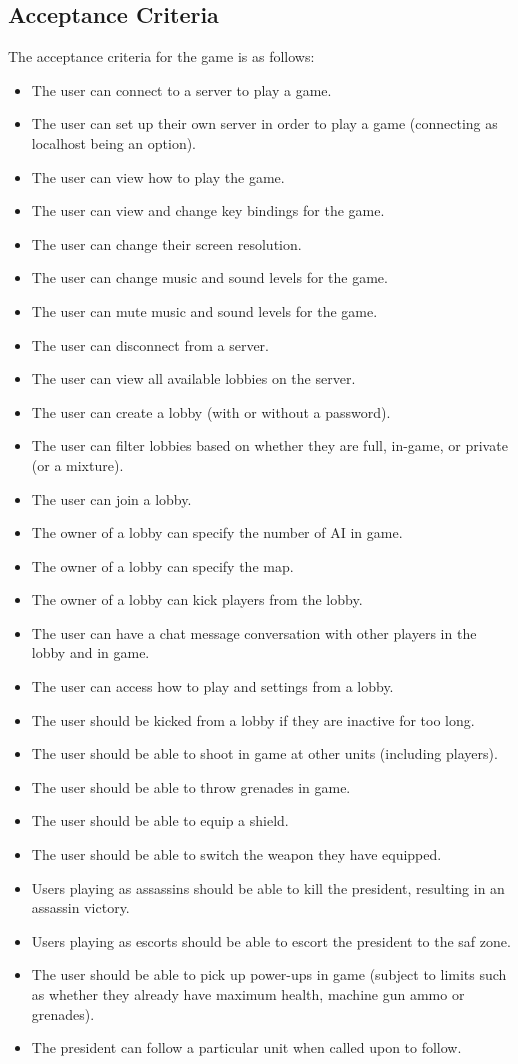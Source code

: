 \documentclass[12pt]{article}
\begin{document}
\subsection{Acceptance Criteria}
The acceptance criteria for the game is as follows:
\begin{itemize}
\item The user can connect to a server to play a game.
\item The user can set up their own server in order to play a game (connecting as localhost being an option).
\item The user can view how to play the game.
\item The user can view and change key bindings for the game.
\item The user can change their screen resolution.
\item The user can change music and sound levels for the game.
\item The user can mute music and sound levels for the game.
\item The user can disconnect from a server.
\item The user can view all available lobbies on the server.
\item The user can create a lobby (with or without a password).
\item The user can filter lobbies based on whether they are full, in-game, or private (or a mixture).
\item The user can join a lobby.
\item The owner of a lobby can specify the number of AI in game.
\item The owner of a lobby can specify the map.
\item The owner of a lobby can kick players from the lobby.
\item The user can have a chat message conversation with other players in the lobby and in game.
\item The user can access how to play and settings from a lobby.
\item The user should be kicked from a lobby if they are inactive for too long.
\item The user should be able to shoot in game at other units (including players).
\item The user should be able to throw grenades in game.
\item The user should be able to equip a shield.
\item The user should be able to switch the weapon they have equipped.
\item Users playing as assassins should be able to kill the president, resulting in an assassin victory.
\item Users playing as escorts should be able to escort the president to the saf zone.
\item The user should be able to pick up power-ups in game (subject to limits such as whether they already have maximum health, machine gun ammo or grenades).
\item The president can follow a particular unit when called upon to follow.
\end{itemize}
\end{document}
